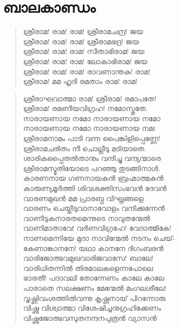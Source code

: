 \chapter{ബാലകാണ്ഡം}

\begin{verse}
ശ്രീരാമ! രാമ! രാമ! ശ്രീരാമചന്ദ്ര! ജയ\\
ശ്രീരാമ! രാമ! രാമ! ശ്രീരാമഭദ്ര! ജയ\\
ശ്രീരാമ! രാമ! രാമ! സീതാഭിരാമ! ജയ\\
ശ്രീരാമ! രാമ! രാമ! ലോകാഭിരാമ! ജയ\\
ശ്രീരാമ! രാമ! രാമ! രാവണാന്തക! രാമ!\\
ശ്രീരാമ! മമ ഹൃദി രമതാം രാമ! രാമ!
\end{verse}

\begin{verse}
ശ്രീരാഘവാത്മാ രാമ! ശ്രീരാമ! രമാപതേ!\\
ശ്രീരാമ! രമണീയവിഗ്രഹ! നമോസ്തുതേ.\\
നാരായണായ നമോ നാരായണായ നമോ\\
നാരായണായ നമോ നാരായണായ നമഃ\\
ശ്രീരാമനാമം പാടി വന്ന പൈങ്കിളിപ്പെണ്ണേ!\\
ശ്രീരാമചരിതം നീ ചൊല്ലീടു മടിയാതെ.\\
ശാരികപ്പൈത‌‌‌ല്‍താനും വന്ദിച്ചു വന്ദ്യന്മാരെ\\
ശ്രീരാമസ്മൃതിയോടെ പറഞ്ഞു തുടങ്ങിനാള്‍.\\
കാരണനായ ഗണനായക‍ന്‍ ബ്രഹ്മാത്മകന്‍\\
കാരുണ്യമൂര്‍ത്തി ശിവശക്തിസംഭവന്‍ ദേവന്‍\\
വാരണമുഖന്‍ മമ പ്രാരബ്ധ വിഘ്നങ്ങളെ\\
വാരണം ചെയ്തീടുവാനാവോളം വന്ദിക്കുന്നേന്‍\\
വാണീടുകനാരതമെന്നുടെ നാവുതന്മേല്‍\\
വാണിമാതാവേ! വര്‍ണവിഗ്രഹേ! വേദാത്മികേ!\\
നാണമെന്നിയേ മുദാ നാവിന്മേല്‍ നടനം ചെയ്-\\
കേണാങ്കാനനേ! യഥാ കാനനേ ദിഗംബരന്‍\\
വാരിജോത്ഭവമുഖവാരിജവാസേ! ബാലേ!\\
വാരിധിതന്നില്‍ തിരമാലകളെന്നപോലെ\\
ഭാരതീ! പദാവലി തോന്നേണം കാലേ കാലേ\\
പാരാതെ സലക്ഷണം മേന്മേല്‍ മംഗലശീലേ!\\
വൃഷ്ണിവംശത്തില്‍വന്നു കൃഷ്ണനായ് പിറന്നോരു\\
വിഷ്ണു വിശ്വാത്മാ വിശേഷിച്ചനുഗ്രഹിക്കേണം\\
വിഷ്ണുജോത്ഭവസുതനന്ദനപുത്രന്‍ വ്യാസന്‍\\

\end{verse}
